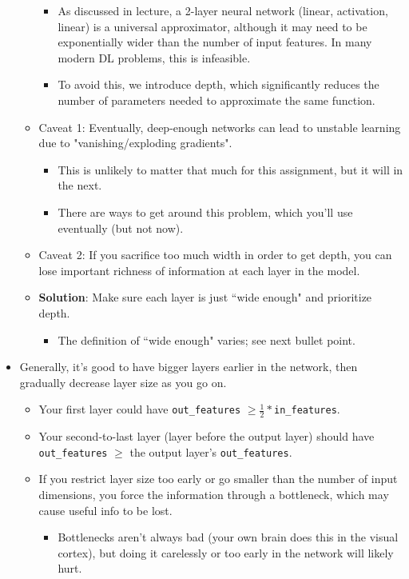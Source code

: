 \documentclass{article}
\newcommand{\ttt}[1]{\texttt{#1}}
\begin{document}
\begin{appendices}
\begin{itemize}
\begin{itemize}
        \begin{itemize}
            \item As discussed in lecture, a 2-layer neural network (linear, activation, linear) is a universal approximator, although it may need to be exponentially wider than the number of input features. In many modern DL problems, this is infeasible.
            \item To avoid this, we introduce depth, which significantly reduces the number of parameters needed to approximate the same function.
        \end{itemize}
        \item Caveat 1: Eventually, deep-enough networks can lead to unstable learning due to "vanishing/exploding gradients".
        \begin{itemize}
            \item This is unlikely to matter that much for this assignment, but it will in the next.
            \item There are ways to get around this problem, which you'll use eventually (but not now).
        \end{itemize}
        \item Caveat 2: If you sacrifice too much width in order to get depth, you can lose important richness of information at each layer in the model.
        \item \textbf{Solution}: Make sure each layer is just ``wide enough" and prioritize depth.
        \begin{itemize}
            \item The definition of ``wide enough" varies; see next bullet point.
        \end{itemize}
    \end{itemize}
    \item Generally, it's good to have bigger layers earlier in the network, then gradually decrease layer size as you go on.
    \begin{itemize}
        \item Your first layer could have \ttt{out\_features} $\geq \frac{1}{2} * $\ttt{in\_features}.
        \item Your second-to-last layer (layer before the output layer) should have \ttt{out\_features} $\geq$ the output layer's \ttt{out\_features}.
        \item If you restrict layer size too early or go smaller than the number of input dimensions, you force the information through a bottleneck, which may cause useful info to be lost.
        \begin{itemize}
            \item Bottlenecks aren't always bad (your own brain does this in the visual cortex), but doing it carelessly or too early in the network will likely hurt. 
        \end{itemize}
    \end{itemize}
 \end{itemize}
 

\end{appendices}
\end{document}
